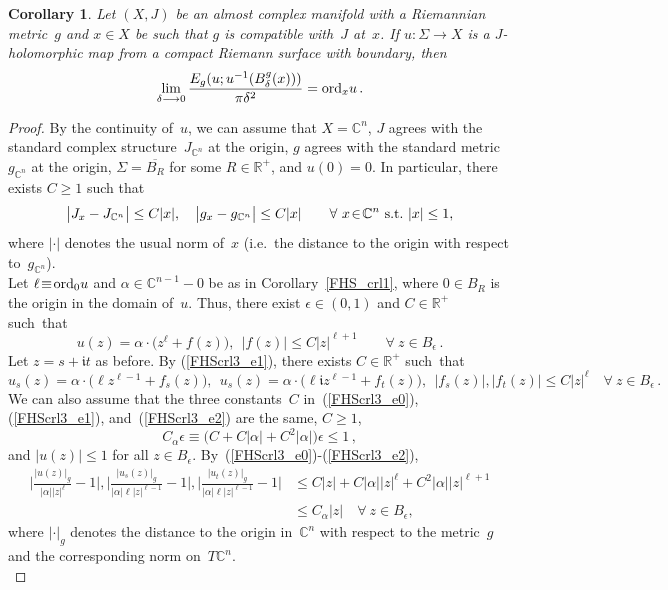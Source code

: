 \documentclass[11pt]{article}
\numberwithin{equation}{section}
\newtheorem{crl}[thm]{Corollary}
\theoremstyle{definition}
\def\BE#1{\begin{equation}\label{#1}}
\def\EE{\end{equation}}
\def\eref#1{(\ref{#1})}
\def\ov#1{\overline{#1}}
\def\lra{\longrightarrow}
\def\C{\mathbb{C}}
\def\fI{\mathfrak i}
\def\R{\mathbb R}
\def\al{\alpha}
\def\de{\delta}
\def\ep{\epsilon}
\def\Si{\Sigma}
\def\ord{\textnormal{ord}}
\begin{document}
\begin{crl}\label{FHS_crl3}
Let $(X,J)$ be an almost complex manifold with a Riemannian metric~$g$
and $x\!\in\!X$ be such that $g$ is compatible with~$J$ at~$x$.
If $u\!:\Si\!\lra\!X$ is a $J$-holomorphic map 
from a compact Riemann surface with boundary, then
$$\lim_{\de\lra0}\frac{E_g(u;u^{-1}(B_{\de}^g(x)))}{\pi\de^2}=\ord_xu\,.$$
\end{crl}

\begin{proof} 
By the continuity of~$u$, we can assume that $X\!=\!\C^n$, 
$J$ agrees with the standard complex structure~$J_{\C^n}$ at the origin,
$g$ agrees with the standard metric~$g_{\C^n}$ at the origin, 
$\Si\!=\!\ov{B_R}$ for some $R\!\in\!\R^+$,
and $u(0)\!=\!0$.
In particular, there exists $C\!\ge\!1$ such that 
\BE{FHScrl3_e0} \big|J_x-J_{\C^n}\big|\le C|x|,  \quad \big|g_x-g_{\C^n}\big|\le C|x|
\qquad\forall~x\!\in\!\C^n~\hbox{s.t.}~|x|\le1,\EE
where $|\cdot|$ denotes the usual norm of~$x$ 
(i.e.~the distance to the origin with respect to~$g_{\C^n}$).\\

\noindent
Let $\ell\!\equiv\!\ord_0u$ and $\al\!\in\!\C^{n-1}\!-\!0$ be
as in Corollary~\ref{FHS_crl1}, where $0\!\in\!B_R$ is 
the origin in the domain of~$u$.
Thus, there exist $\ep\!\in\!(0,1)$ and $C\!\in\!\R^+$ such~that 
\BE{FHScrl3_e1} u(z)=\al\cdot\big(z^{\ell}\!+\!f(z)\big),~~
\big|f(z)\big|\le C|z|^{\ell+1} \qquad\forall~z\!\in\!B_{\ep}\,.\EE
Let $z\!=\!s\!+\!\fI t$ as before.
By \eref{FHScrl3_e1}, there exists $C\!\in\!\R^+$ such~that
\BE{FHScrl3_e2} u_s(z)=\al\cdot\big(\ell z^{\ell-1}\!+\!f_s(z)\big),~~
u_s(z)=\al\cdot\big(\ell \fI z^{\ell-1}\!+\!f_t(z)\big),~~
\big|f_s(z)\big|,\big|f_t(z)\big|\le C|z|^{\ell} \quad\forall~z\!\in\!B_{\ep}\,.\EE
We can also assume that the three constants~$C$ in~\eref{FHScrl3_e0}, \eref{FHScrl3_e1}, 
and~\eref{FHScrl3_e2} are the same, $C\!\ge\!1$, 
$$C_{\al}\ep \equiv (C\!+\!C|\al|\!+\!C^2|\al|\big)\ep\le 1\,,$$
and $|u(z)|\!\le\!1$ for all $z\!\in\!B_{\ep}$.
By~\eref{FHScrl3_e0}-\eref{FHScrl3_e2}, 
\BE{FHScrl3_e5}\begin{split}
\bigg|\frac{|u(z)|_g}{|\al||z|^{\ell}}-1\bigg|,
\bigg|\frac{|u_s(z)|_g}{|\al|\ell|z|^{\ell-1}}-1\bigg|,
\bigg|\frac{|u_t(z)|_g}{|\al|\ell|z|^{\ell-1}}-1\bigg|
&\le C|z|+C|\al||z|^{\ell}+C^2|\al||z|^{\ell+1}\\
&\le C_{\al}|z|\quad\forall~z\in B_{\ep},
\end{split}\EE
where $|\cdot|_g$ denotes the distance to the origin in~$\C^n$ with respect to
the metric~$g$ and the corresponding norm on~$T\C^n$.\\


\end{proof}
\end{document}
